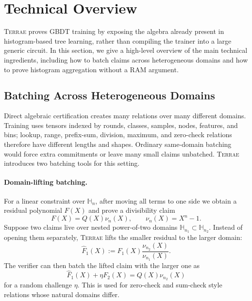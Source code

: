 \section{Technical Overview}
\label{sec:technical-overview}

\textsc{Terrae} proves GBDT training by exposing the algebra already present in
histogram-based tree learning, rather than compiling the trainer into a large
generic circuit. 
In this section, we give a high-level overview of the main technical ingredients,
including how to batch claims across heterogeneous domains and how to prove histogram aggregation without a RAM argument.


\subsection{Batching Across Heterogeneous Domains}

Direct algebraic certification creates many relations over many different
domains. Training uses tensors indexed by rounds, classes, samples, nodes,
features, and bins; lookup, range, prefix-sum, division, maximum, and
zero-check relations therefore have different lengths and shapes. Ordinary
same-domain batching would force extra commitments or leave many small claims
unbatched. \textsc{Terrae} introduces two batching tools for this setting.

\paragraph{Domain-lifting batching.}
For a linear constraint over $\mathbb{H}_n$, after moving all terms to one side
we obtain a residual polynomial $F(X)$ and prove a divisibility claim
\[
    F(X)=Q(X)\nu_n(X),
    \qquad
    \nu_n(X)=X^n-1.
\]
Suppose two claims live over nested power-of-two domains
$\mathbb{H}_{n_1}\subset \mathbb{H}_{n_2}$. Instead of opening them separately,
\textsc{Terrae} lifts the smaller residual to the larger domain:
\[
    \widehat{F}_1(X)
    :=
    F_1(X)\frac{\nu_{n_2}(X)}{\nu_{n_1}(X)}.
\]
The verifier can then batch the lifted claim with the larger one as
\[
    \widehat{F}_1(X)+\eta F_2(X)=Q(X)\nu_{n_2}(X)
\]
for a random challenge $\eta$. This is used for zero-check and sum-check style
relations whose natural domains differ.

